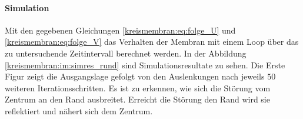 \paragraph{Simulation}
Mit den gegebenen Gleichungen \ref{kreismembran:eq:folge_U} und \ref{kreismembran:eq:folge_V} das Verhalten der Membran mit einem Loop über das zu untersuchende Zeitintervall berechnet werden. 
In der Abbildung \ref{kreismembran:im:simres_rund} sind Simulationsresultate zu sehen.
Die Erste Figur zeigt die Ausgangslage gefolgt von den Auslenkungen nach jeweils $ 50 $ weiteren Iterationsschritten.
Es ist zu erkennen, wie sich die Störung vom Zentrum an den Rand ausbreitet.
Erreicht die Störung den Rand wird sie reflektiert und nähert sich dem Zentrum. 
\begin{figure}
	
	\begin{center}
		

\end{center}
\end{figure}
